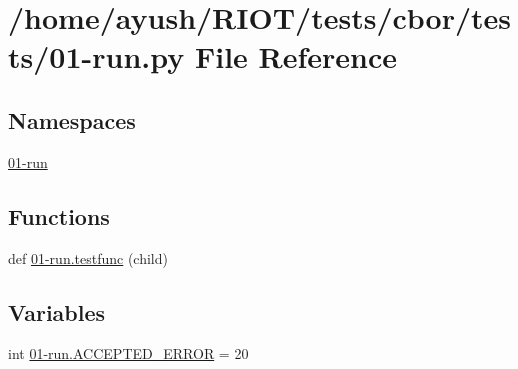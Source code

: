 \hypertarget{cbor_2tests_201-run_8py}{}\section{/home/ayush/\+R\+I\+O\+T/tests/cbor/tests/01-\/run.py File Reference}
\label{cbor_2tests_201-run_8py}
\subsection*{Namespaces}
\begin{DoxyCompactItemize}
\item 
 \hyperlink{namespace01-run}{01-\/run}
\end{DoxyCompactItemize}
\subsection*{Functions}
\begin{DoxyCompactItemize}
\item 
def \hyperlink{namespace01-run_aff983ffd4ab0e6bf8e7e58970e4a10bb}{01-\/run.\+testfunc} (child)
\end{DoxyCompactItemize}
\subsection*{Variables}
\begin{DoxyCompactItemize}
\item 
int \hyperlink{namespace01-run_a7c32ad0e8ff69ef035a02a3089c5992f}{01-\/run.\+A\+C\+C\+E\+P\+T\+E\+D\+\_\+\+E\+R\+R\+OR} = 20
\end{DoxyCompactItemize}
